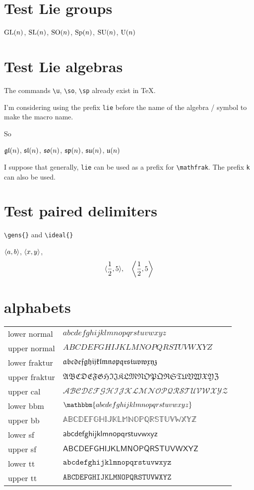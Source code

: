 \documentclass{scrartcl}
\begin{document}
\section{Test Lie groups}

$\GL(n)$, $\SL(n)$, $\SO(n)$, $\Sp(n)$, $\SU(n)$, $\U(n)$

\section{Test Lie algebras}

The commands \verb|\u|, \verb|\so|, \verb|\sp| already exist in \TeX.

I'm considering using the prefix \texttt{lie} before the name of the algebra / symbol to make the macro name.

So
\begin{LTXexample}[pos=b]
$\liegl(n)$, $\liesl(n)$, $\lieso(n)$, $\liesp(n)$, $\liesu(n)$, $\lieu(n)$
\end{LTXexample}


I suppose that generally, \texttt{lie} can be used as a prefix for \verb|\mathfrak|.
The prefix \texttt{k} can also be used.

\section{Test paired delimiters}
\verb|\gens{}| and \verb|\ideal{}|

$\gens{a,b}$,
$\ideal{x,y}$,
\[
\gens{\frac12, 5}, \quad
\gens*{\frac12, 5}
\]

\section{alphabets}

\begin{tabular}{ll}
lower normal & $abcdefghijklmnopqrstuvwxyz$ \\
upper normal & $ABCDEFGHIJKLMNOPQRSTUVWXYZ$ \\
lower fraktur & $\mathfrak{abcdefghijklmnopqrstuvwxyz}$ \\
upper fraktur & $\mathfrak{ABCDEFGHIJKLMNOPQRSTUVWXYZ}$ \\
upper cal & $\mathcal{ABCDEFGHIJKLMNOPQRSTUVWXYZ}$ \\
lower bbm & $\mathbbm{abcdefghijklmnopqrstuvwxyz}$ \\
upper bb & $\mathbb{ABCDEFGHIJKLMNOPQRSTUVWXYZ}$ \\
lower sf & $\mathsf{abcdefghijklmnopqrstuvwxyz}$ \\
upper sf & $\mathsf{ABCDEFGHIJKLMNOPQRSTUVWXYZ}$ \\
lower tt & $\mathtt{abcdefghijklmnopqrstuvwxyz}$ \\
upper tt & $\mathtt{ABCDEFGHIJKLMNOPQRSTUVWXYZ}$ \\
\end{tabular}
\end{document}
